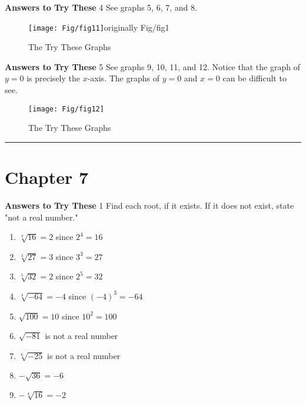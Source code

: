 \documentclass[a4paper]{JAC2003}
\begin{document}
\noindent\textcolor{red!75!black}{\textbf{Answers to Try These}} 4 See graphs 5, 6, 7, and 8.

\begin{figure}[H]
\centering
\caption{The Try These Graphs}
\texttt{[image: Fig/fig11]}originally Fig/fig1
\end{figure}

\noindent\textcolor{red!75!black}{\textbf{Answers to Try These}} 5 See graphs 9, 10, 11, and 12. Notice that the graph of $y=0$ is precisely the $x$-axis. The graphs of $y=0$ and $x=0$ can be difficult to see.


\begin{figure}[H]
\centering
\caption{The Try These Graphs}
\texttt{[image: Fig/fig12]}
\end{figure}
\noindent\rule[0.5ex]{\linewidth}{1pt}

\section{Chapter 7}

\noindent\textcolor{red!75!black}{\textbf{Answers to Try These}} 1 Find each root, if it exists. If it does not exist, state "not a real number."
\begin{enumerate}
\item $\sqrt[4]{16}=2$ since $2^{4}=16$

\item $\sqrt[3]{27}=3$ since $3^{3}=27$

\item $\sqrt[5]{32}=2$ since $2^{5}=32$

\item $\sqrt[3]{-64}=-4$ since $(-4)^{3}=-64$

\item $\sqrt{100}=10$ since $10^{2}=100$

\item $\sqrt{-81}$ is not a real number

\item $\sqrt[6]{-25}$ is not a real number

\item $-\sqrt{36}=-6$ %

\item $-\sqrt[4]{16}=-2$
\end{enumerate}
\end{document}
